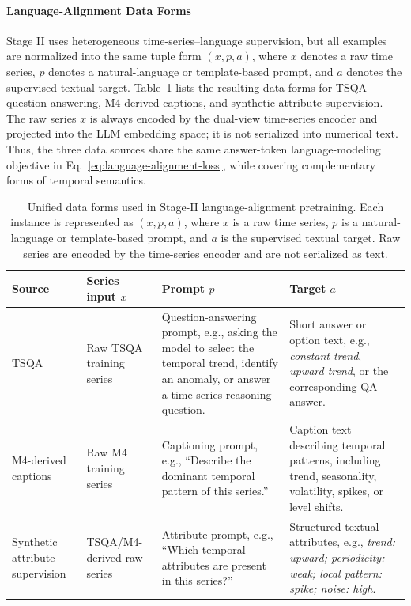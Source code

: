 \documentclass[10pt,journal,compsoc]{IEEEtran}
\begin{document}
\paragraph{Language-Alignment Data Forms}
Stage II uses heterogeneous time-series--language supervision, but all examples are normalized into the same tuple form $(x,p,a)$, where $x$ denotes a raw time series, $p$ denotes a natural-language or template-based prompt, and $a$ denotes the supervised textual target.
Table~\ref{tab:pretrain-data-forms} lists the resulting data forms for TSQA question answering, M4-derived captions, and synthetic attribute supervision.
The raw series $x$ is always encoded by the dual-view time-series encoder and projected into the LLM embedding space; it is not serialized into numerical text.
Thus, the three data sources share the same answer-token language-modeling objective in Eq.~\eqref{eq:language-alignment-loss}, while covering complementary forms of temporal semantics.

\begin{table}[t]
\centering
\caption{Unified data forms used in Stage-II language-alignment pretraining. Each instance is represented as $(x,p,a)$, where $x$ is a raw time series, $p$ is a natural-language or template-based prompt, and $a$ is the supervised textual target. Raw series are encoded by the time-series encoder and are not serialized as text.}
\label{tab:pretrain-data-forms}
\scriptsize
\setlength{\tabcolsep}{2.5pt}
\renewcommand{\arraystretch}{1.08}
\begin{tabular}{@{}p{}p{}p{}p{}@{}}
\toprule
\textbf{Source} & \textbf{Series input $x$} & \textbf{Prompt $p$} & \textbf{Target $a$} \\
\midrule
TSQA & Raw TSQA training series &
Question-answering prompt, e.g., asking the model to select the temporal trend, identify an anomaly, or answer a time-series reasoning question. &
Short answer or option text, e.g., \emph{constant trend}, \emph{upward trend}, or the corresponding QA answer. \\
\midrule
M4-derived captions & Raw M4 training series &
Captioning prompt, e.g., ``Describe the dominant temporal pattern of this series.'' &
Caption text describing temporal patterns, including trend, seasonality, volatility, spikes, or level shifts. \\
\midrule
Synthetic attribute supervision & TSQA/M4-derived raw series &
Attribute prompt, e.g., ``Which temporal attributes are present in this series?'' &
Structured textual attributes, e.g., \emph{trend: upward; periodicity: weak; local pattern: spike; noise: high}. \\
\bottomrule
\end{tabular}
\end{table}
\end{document}
